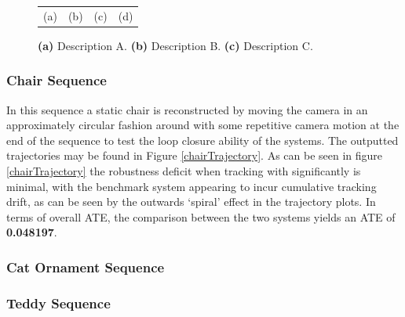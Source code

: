 \begin{figure}[h]
\begin{tabular}{cccc}
		(a)&(b)&(c)&(d)
	\end{tabular}
	\caption{
		\textbf{(a)} Description A.
		\textbf{(b)} Description B.
		\textbf{(c)} Description C.
	}
\label{fig:tumTrajectories}
\vspace{-1.5\baselineskip}
\end{figure}

\subsubsection{Chair Sequence}
In this sequence a static chair is reconstructed by moving the camera in an approximately circular fashion around with some repetitive camera motion at the end of the sequence to test 
the loop closure ability of the systems. The outputted trajectories may be found in Figure \ref{chairTrajectory}.
As can be seen in figure \ref{chairTrajectory} the robustness deficit when tracking with significantly is minimal, with the benchmark system appearing to incur cumulative tracking drift, as can be seen 
by the outwards `spiral' effect in the trajectory plots. In terms of overall ATE, the comparison between the two systems yields an ATE of \textbf{0.048197}.

\subsubsection{Cat Ornament Sequence}
%

\subsubsection{Teddy Sequence}